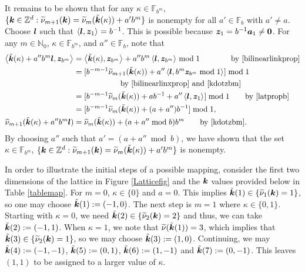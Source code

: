 \documentclass[graybox]{svmult}
\newcommand{\Z}{\mathbb{Z}} %
\newcommand{\N}{\mathbb{N}} %
\newcommand{\F}{\mathbb{F}} %
\newcommand{\bszero}{\boldsymbol{0}} %
\newcommand{\bsz}{\boldsymbol{z}}    %
\begin{document}
It remains to be shown that for any $\kappa \in \F_{b^{m}}$, $\{\bsk \in  \Z^d : \tnu_{m+1}(\bsk)=\tnu_{m}(\tvk(\kappa))+a' b^m\}$ is nonempty for all $a' \in \F_b$ with $a' \ne a$.  Choose $\boldsymbol{l}$ such that $\ip{\bsl}{\bsz_1}=b^{-1}$. This is possible because $\bsz_1 = b^{-1} \bsa_1 \ne \bszero$.  For any $m \in \N_0$, $\kappa \in \F_{b^m}$, and  $a'' \in \F_b$, note that
\begin{align*}
\ip{\tvk(\kappa) + a'' b^{m} \bsl}{\bsz_{b^{m}}}& = \ip{\tvk(\kappa)}{\bsz_{b^{m}}} + a'' b^m \ip{\bsl}{\bsz_{b^{m}}} \bmod 1 \qquad \qquad \text{by \eqref{bilinearlinkprop}} \\
&= [b^{-m-1}\tnu_{m+1}(\tvk(\kappa)) + a'' \ip{\bsl}{b^m  \bsz_{b^{m}}\bmod 1}] \bmod 1 \\
& \qquad \qquad \qquad  \text{by \eqref{bilinearlinxprop} and \eqref{kdotzbm}}\\
&= [b^{-m-1}\tnu_{m}(\tvk(\kappa)) + a b^{-1} + a'' \ip{\bsl}{\bsz_{1}}] \bmod 1 \qquad  \text{by \eqref{latpropb}}\\
&= [b^{-m-1}\tnu_{m}(\tvk(\kappa)) + (a+a'') b^{-1}] \bmod 1,\\
\tnu_{m+1}(\tvk(\kappa) + a'' b^{m} \bsl) & = 
\tnu_{m}(\tvk(\kappa)) + (a+a'' \bmod b) b^{m} \qquad \text{by \eqref{kdotzbm}}.
\end{align*}
By choosing $a''$ such that $a'=(a+a'' \bmod b)$, we have shown that the set $\kappa \in \F_{b^{m}}$, $\{\bsk \in  \Z^d : \tnu_{m+1}(\bsk)=\tnu_{m}(\tvk(\kappa))+a' b^m\}$ is nonempty.

In order to illustrate the initial steps of a possible mapping, consider the first two dimensions of the lattice in Figure \ref{Latticefig} and the $\boldsymbol{k}$ values provided below in Table \ref{tablemap}. For $m=0$, $\kappa\in\{0\}$ and $a=0$. This implies $\tilde{\boldsymbol{k}}(1)\in\{\widetilde{\nu}_{1}(\boldsymbol{k})=1\}$, so one may choose $\tilde{\boldsymbol{k}}(1):=(-1,0)$. The next step is $m=1$ where $\kappa\in\{0,1\}$. Starting with $\kappa=0$, we need $\tilde{\boldsymbol{k}}(2)\in\{\widetilde{\nu}_{2}(\boldsymbol{k})=2\}$ and thus, we can take $\tilde{\boldsymbol{k}}(2):=(-1,1)$. When $\kappa=1$, we note that $\widetilde{\nu}(\tilde{\boldsymbol{k}}(1))=3$, which implies that $\tilde{\boldsymbol{k}}(3)\in\{\widetilde{\nu}_{2}(\boldsymbol{k})=1\}$, so we may choose $\tilde{\boldsymbol{k}}(3):=(1,0)$. Continuing, we may  $\tilde{\boldsymbol{k}}(4):=(-1,-1)$, $\tilde{\boldsymbol{k}}(5):=(0,1)$, $\tilde{\boldsymbol{k}}(6):=(1,-1)$ and $\tilde{\boldsymbol{k}}(7):=(0,-1)$.  This leaves $(1,1)$ to be assigned to a larger value of $\kappa$.
\end{document}

